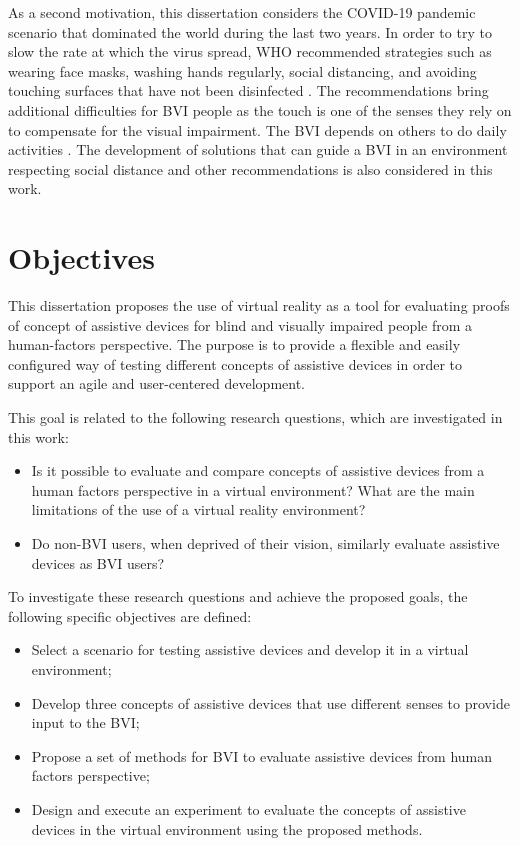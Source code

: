 As a second motivation, this dissertation considers the COVID-19 pandemic scenario that dominated the world during the last two years. In order to try to slow the rate at which the virus spread, WHO recommended strategies such as wearing face masks, washing hands regularly, social distancing, and avoiding touching surfaces that have not been disinfected \cite{who_2020}. The recommendations bring additional difficulties for BVI people as the touch is one of the senses they rely on to compensate for the visual impairment. The BVI depends on others to do daily activities \cite{jondani2021strategies}. The development of solutions that can guide a BVI in an environment respecting social distance and other recommendations is also considered in this work.

\section{Objectives}
\label{sec:objetivos}

 This dissertation proposes the use of virtual reality as a tool for evaluating proofs of concept of assistive devices for blind and visually impaired people from a human-factors perspective. The purpose is to provide a flexible and easily configured way of testing different concepts of assistive devices in order to support an agile and user-centered development.

 This goal is related to the following research questions, which are investigated in this work:

 \begin{itemize}
    \item Is it possible to evaluate and compare concepts of assistive devices from a human factors perspective in a virtual environment? What are the main limitations of the use of a virtual reality environment? \label{itm:obj_first}
    \item Do non-BVI users, when deprived of their vision, similarly evaluate assistive devices as BVI users? \label{itm:obj_second}
\end{itemize}
  
 To investigate these research questions and achieve the proposed goals, the following specific objectives are defined:
 
 \begin{itemize}
     \item Select a scenario for testing assistive devices and develop it in a virtual environment; \label{itm:subobj_first}
     \item Develop three concepts of assistive devices that use different senses to provide input to the BVI; \label{itm:subobj_second}
     \item Propose a set of methods for BVI to evaluate assistive devices from human factors perspective; \label{itm:subobj_third}
     \item Design and execute an experiment to evaluate the concepts of assistive devices in the virtual environment using the proposed methods. \label{itm:subobj_forth}
 \end{itemize}
 
